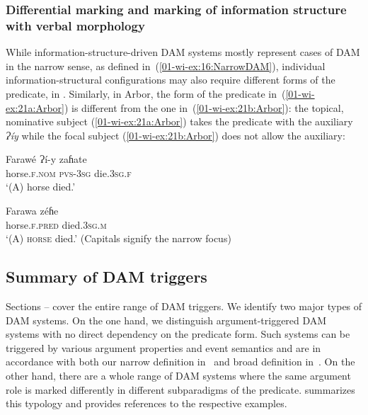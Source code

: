 \documentclass[output=paper]{LSP/langsci}
\begin{document}
\subsubsection{Differential marking and marking of information structure with verbal morphology}
\label{01-wi-sec:2.2.4-Differential}

While information-structure-driven DAM systems mostly represent cases of DAM in the narrow sense, as defined in~(\ref{01-wi-ex:16:NarrowDAM}), individual information-structural configurations may also require different forms of the predicate, \eg in  \citep{Saeed1987Somali}. 
Similarly, in Arbor, the form of the predicate in~(\ref{01-wi-ex:21a:Arbor}) is different from the one in~(\ref{01-wi-ex:21b:Arbor}): the topical, nominative subject (\ref{01-wi-ex:21a:Arbor}) takes the predicate with the auxiliary \textit{Ɂíy} while the focal subject (\ref{01-wi-ex:21b:Arbor}) does not allow the auxiliary:

\ea\label{01-wi-ex:21:Arbor}
\begin{xlist}

\ex\label{01-wi-ex:21a:Arbor}
	\gll Farawé 		Ɂí-y 		zaɦate\\
	horse.\textsc{f.nom} 	\textsc{pvs}-\textsc{3sg}	die.\textsc{3sg.f}\\
	\glt ‘(A) horse died.’

\ex\label{01-wi-ex:21b:Arbor}
	\gll Farawa 		zéɦe\\
	horse.\textsc{f.pred} 	died.\textsc{3sg.m}\\
	\glt ‘(A) \textsc{horse} died.’ (Capitals signify the narrow focus)
\end{xlist}
\z

\subsection{Summary of DAM triggers}
\label{01-wi-sec:2.3-Summary-triggers}

Sections – cover the entire range of DAM triggers. 
We identify two major types of DAM systems. 
On the one hand, we distinguish argument-triggered DAM systems with no direct dependency on the predicate form. 
Such systems can be triggered by various argument properties and event semantics and are in accordance with both our narrow definition in~ and broad definition in~. 
On the other hand, there are a whole range of DAM systems where the same argument role is marked differently in different subparadigms of the predicate. 
 summarizes this typology and provides references to the respective examples. 
\end{document}
